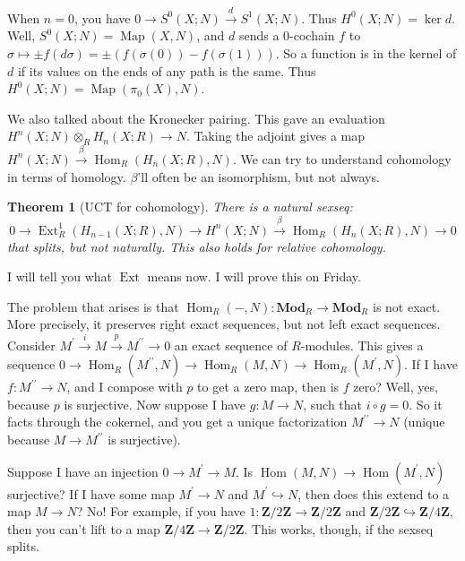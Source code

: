 \documentclass{amsart}
\theoremstyle{theorem}
\newtheorem{theorem}{Theorem}[section]
\theoremstyle{definition}
\DeclareMathOperator{\Ext}{Ext}
\DeclareMathOperator{\Hom}{Hom}
\DeclareMathOperator{\Map}{Map}
\newcommand{\Z}{\mathbf Z}
\begin{document}
When $n=0$, you have $0\to S^0(X;N)\xrightarrow{d} S^1(X;N)$. Thus $ H^0(X;N)=\ker d$. Well, $S^0(X;N)=\Map(X,N)$, and $d$ sends a $0$-cochain $f$ to $\sigma\mapsto\pm f(d\sigma)=\pm(f(\sigma(0))-f(\sigma(1)))$. So a function is in the kernel of $d$ if its values on the ends of any path is the same. Thus $ H^0(X;N)=\Map(\pi_0(X),N)$.

We also talked about the Kronecker pairing. This gave an evaluation $ H^n(X;N)\otimes_R H_n(X;R)\to N$. Taking the adjoint gives a map $ H^n(X;N)\xrightarrow{\beta}\Hom_R( H_n(X;R),N)$. We can try to understand cohomology in terms of homology. $\beta$'ll often be an isomorphism, but not always.
\begin{theorem}[UCT for cohomology]
There is a natural sexseq:
\begin{equation*}
0\to\Ext^1_R( H_{n-1}(X;R),N)\to H^n(X;N)\xrightarrow{\beta}\Hom_R( H_n(X;R),N)\to 0
\end{equation*}
that splits, but not naturally. This also holds for relative cohomology.
\end{theorem}
I will tell you what $\Ext$ means now. I will prove this on Friday.

The problem that arises is that $\Hom_R(-,N):\mathbf{Mod}_R\to\mathbf{Mod}_R$ is not exact. More precisely, it preserves right exact sequences, but not left exact sequences. Consider $M^\prime\xrightarrow{i} M\xrightarrow{p} M^{\prime\prime}\to 0$ an exact sequence of $R$-modules. This gives a sequence $0\to \Hom_R(M^{\prime\prime},N)\to\Hom_R(M,N)\to \Hom_R(M^{\prime},N)$. If I have $f:M^{\prime\prime}\to N$, and I compose with $p$ to get a zero map, then is $f$ zero? Well, yes, because $p$ is surjective. Now suppose I have $g:M\to N$, such that $i\circ g=0$. So it facts through the cokernel, and you get a unique factorization $M^{\prime\prime}\to N$ (unique because $M\to M^{\prime\prime}$ is surjective).

Suppose I have an injection $0\to M^\prime\to M$. Is $\Hom(M,N)\to\Hom(M^\prime,N)$ surjective? If I have some map $M^\prime\to N$ and $M^\prime\hookrightarrow N$, then does this extend to a map $M\to N$? No! For example, if you have $1:\Z/2\Z\to\Z/2\Z$ and $\Z/2\Z\hookrightarrow\Z/4\Z$, then you can't lift to a map $\Z/4\Z\to\Z/2\Z$. This works, though, if the sexseq splits.
\end{document}
